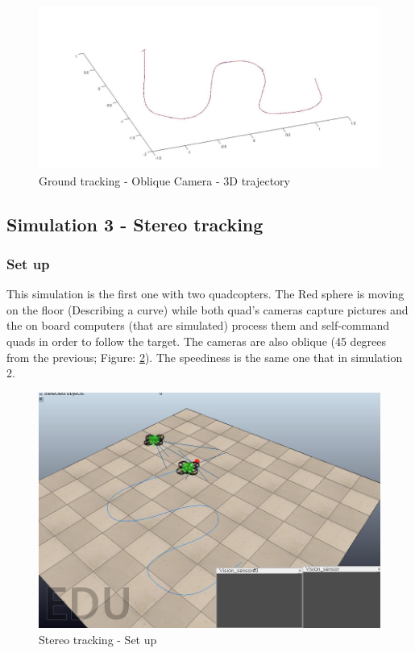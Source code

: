 \begin{figure}[h]
\centering
\includegraphics[width=0.9\linewidth]{../Images/c3/sim2_traj_both_3d}
\caption{Ground tracking - Oblique Camera - 3D trajectory}
\label{fig:sim2_traj_both_3d}
\end{figure}




\subsection{Simulation 3 - Stereo tracking}
\subsubsection{Set up}
This simulation is the first one with two quadcopters. The Red sphere is moving on the floor (Describing a curve) while both quad's cameras capture pictures and the on board computers (that are simulated) process them and self-command quads in order to follow the target. The cameras are also oblique (45 degrees from the previous; Figure: \ref{fig:sim3_set_up}). The speediness is the same one that in simulation 2.


\begin{figure}[htp]
	\centering
	\includegraphics[width=0.65\linewidth]{../Images/c3/sim3_set_up}
	\caption{Stereo tracking - Set up}
	\label{fig:sim3_set_up}
\end{figure}


